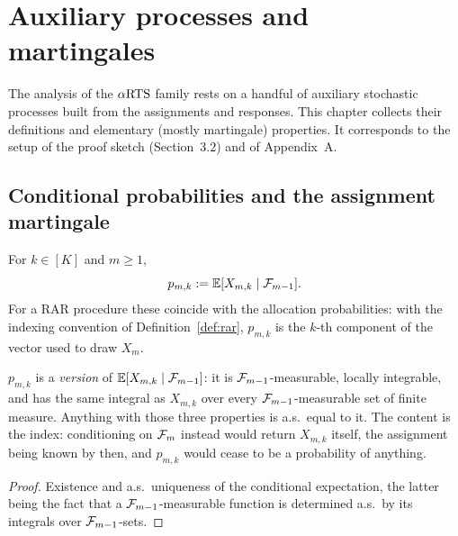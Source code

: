 \chapter{Auxiliary processes and martingales}
\label{chap:auxiliary}

The analysis of the $\alpha\text{RTS}$ family rests on a handful of auxiliary stochastic
processes built from the assignments and responses. This chapter collects their
definitions and elementary (mostly martingale) properties. It corresponds to the
setup of the proof sketch (Section~3.2) and of Appendix~A.

\section{Conditional probabilities and the assignment martingale}
\label{sec:aux_assignment}

\begin{definition}\label{def:cond_prob}
\leanok
{}
For $k \in [K]$ and $m \ge 1$,
\[
  p_{m,k} := \mathbb{E}[X_{m,k} \mid \mathcal{F}_{m-1}].
\]
For a RAR procedure these coincide with the allocation probabilities: with the
indexing convention of Definition~\ref{def:rar}, $p_{m,k}$ is the $k$-th
component of the vector used to draw $X_m$.
\end{definition}

\begin{lemma}\label{lem:cond_prob_unique}
\leanok
{}
$p_{m,k}$ is a \emph{version} of $\mathbb{E}[X_{m,k}\mid\mathcal{F}_{m-1}]$: it is $\mathcal{F}_{m-1}$-measurable,
locally integrable, and has the same integral as $X_{m,k}$ over every $\mathcal{F}_{m-1}$-measurable set
of finite measure. Anything with those three properties is a.s.\ equal to it. The content is the
index: conditioning on $\mathcal{F}_m$ instead would return $X_{m,k}$ itself, the assignment being known
by then, and $p_{m,k}$ would cease to be a probability of anything.
\end{lemma}

\begin{proof}\leanok
Existence and a.s.\ uniqueness of the conditional expectation, the latter being the fact that a
$\mathcal{F}_{m-1}$-measurable function is determined a.s.\ by its integrals over $\mathcal{F}_{m-1}$-sets.
\end{proof}

